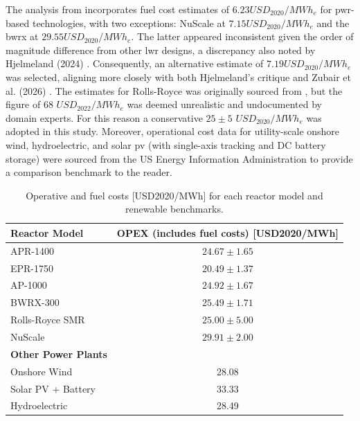 The analysis from \cite{STEIGERWALD2023128204} incorporates fuel cost estimates of $6.23 USD_{2020}/MWh_e$ for \gls{pwr}-based technologies, with two exceptions: NuScale at $7.15 USD_{2020}/MWh_e$ and the \gls{bwrx} at $29.55 USD_{2020}/MWh_e$. The latter appeared inconsistent given the order of magnitude difference from other \gls{lwr} designs, a discrepancy also noted by Hjelmeland (2024) \cite{HJELMELAND2024133827}. Consequently, an alternative estimate of $7.19 USD_{2020}/MWh_e$ was selected, aligning more closely with both Hjelmeland's critique and Zubair et al. (2026) \cite{ZUBAIR2026111989}. The estimates for Rolls-Royce was originally sourced from \cite{PowerTechnology2022}, but the figure of $68$ $USD_{2022}/MWh_e$ was deemed unrealistic and undocumented by domain experts. For this reason a conservative $25 \pm 5$ $USD_{2020}/MWh_e$ was adopted in this study. Moreover, operational cost data for utility-scale onshore wind, hydroelectric, and solar \gls{pv} (with single-axis tracking and DC battery storage) were sourced from the US Energy Information Administration \cite{EIA_Capital_Costs_AEO2024} to provide a comparison benchmark to the reader. 
\begin{table}[!hb]
    \centering
    \begin{tabularx}{\textwidth}{X c}
        \toprule
        \textbf{Reactor Model} & \textbf{OPEX (includes fuel costs) [USD2020/MWh]} \\
        \midrule
        APR-1400         & $24.67 \pm 1.65$ \\
        EPR-1750        & $20.49 \pm 1.37$ \\
        AP-1000          & $24.92 \pm 1.67$ \\
        BWRX-300        & $25.49 \pm 1.71$ \\
        Rolls-Royce SMR & $25.00 \pm 5.00$ \\
        NuScale         & $29.91 \pm 2.00$ \\
        \textbf{Other Power Plants} & \\
        Onshore Wind   & 28.08 \\
        Solar PV + Battery & 33.33 \\
        Hydroelectric  & 28.49 \\
        \bottomrule
    \end{tabularx}
    \caption{Operative and fuel costs [USD2020/MWh] for each reactor model and renewable benchmarks.}
    \label{tab:economic-indicators}
\end{table}
